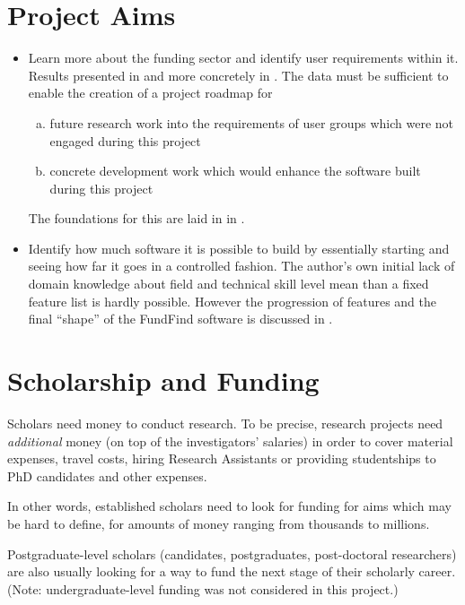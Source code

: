 \section{Project Aims}
\label{intro-aims}
\begin{itemize}
 \item Learn more about the funding sector and identify user requirements within it. Results presented in  and more concretely in . The data must be sufficient to enable the creation of a project roadmap for
    \begin{enumerate}[a)]
    \item future research work into the requirements of user groups which were not engaged during this project
    \item concrete development work which would enhance the software built during this project
    \end{enumerate}
  The foundations for this are laid in in .
  
 \item Identify how much software it is possible to build by essentially starting and seeing how far it goes in a controlled fashion. The author's own initial lack of domain knowledge about field and technical skill level mean than a fixed feature list is hardly possible. However the progression of features and the final ``shape'' of the FundFind software is discussed in .
\end{itemize}

\section{Scholarship and Funding}
Scholars need money to conduct research. To be precise, research projects need \emph{additional} money (on top of the investigators' salaries) in order to cover material expenses, travel costs, hiring Research Assistants or providing studentships to PhD candidates and other expenses. 

In other words, established scholars need to look for funding for aims which may be hard to define, for amounts of money ranging from thousands to millions.

Postgraduate-level scholars (candidates, postgraduates, post-doctoral researchers) are also usually looking for a way to fund the next stage of their scholarly career. (Note: undergraduate-level funding was not considered in this project.)

